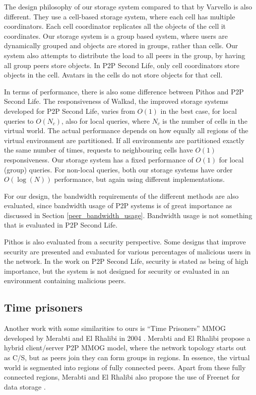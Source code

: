 The design philosophy of our storage system compared to that by Varvello is also different. They use a cell-based storage system, where each cell has multiple coordinators. Each cell coordinator replicates all the objects of the cell it coordinates. Our storage system is a group based system, where users are dynamically grouped and objects are stored in groups, rather than cells. Our system also attempts to distribute the load to all peers in the group, by having all group peers store objects. In P2P Second Life, only cell coordinators store objects in the cell. Avatars in the cells do not store objects for that cell.

In terms of performance, there is also some difference between Pithos and P2P Second Life. The responsiveness of Walkad, the improved storage systems developed for P2P Second Life, varies from $O(1)$ in the best case, for local queries to $O(N_c)$, also for local queries, where $N_c$ is the number of cells in the virtual world. The actual performance depends on how equally all regions of the virtual environment are partitioned. If all environments are partitioned exactly the same number of times, requests to neighbouring cells have $O(1)$ responsiveness. Our storage system has a fixed performance of $O(1)$ for local (group) queries. For non-local queries, both our storage systems have order $O(\log (N))$ performance, but again using different implementations.

For our design, the bandwidth requirements of the different methods are also evaluated, since bandwidth usage of P2P systems is of great importance as discussed in Section \ref{peer_bandwidth_usage}. Bandwidth usage is not something that is evaluated in P2P Second Life.

Pithos is also evaluated from a security perspective. Some designs that improve security are presented and evaluated for various percentages of malicious users in the network. In the work on P2P Second Life, security is stated as being of high importance, but the system is not designed for security or evaluated in an environment containing malicious peers.

\subsection{Time prisoners}

Another work with some similarities to ours is ``Time Prisoners'' MMOG developed by Merabti and El Rhalibi in 2004 \cite{using_freenet_storage}. Merabti and El Rhalibi propose a hybrid client/server P2P MMOG model, where the network topology starts out as C/S, but as peers join they can form groups in regions. In essence, the virtual world is segmented into regions of fully connected peers. Apart from these fully connected regions, Merabti and El Rhalibi also propose the use of Freenet for data storage \cite{clarke_freenet}.

